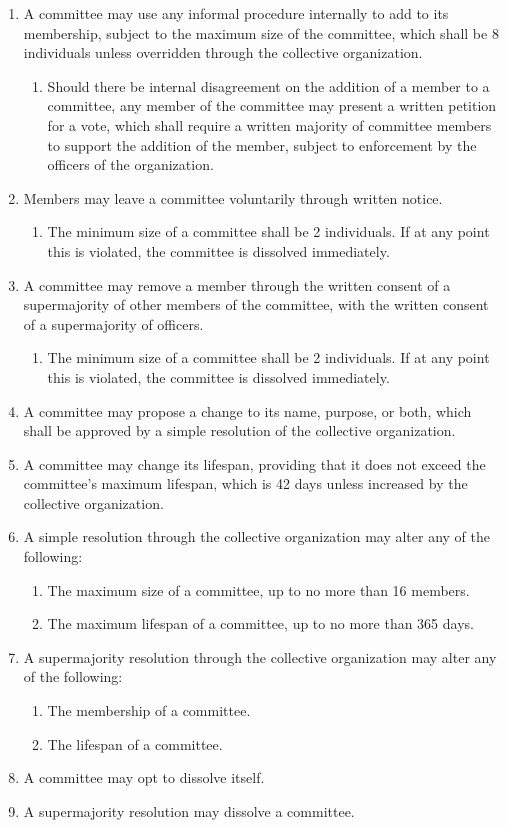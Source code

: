 \documentclass[11pt]{article}
\newcounter{h1}
\newcounter{h2}[h1]
\newcounter{h3}[h2]
\begin{document}
\begin{enumerate}
  \item A committee may use any informal procedure internally to add to its membership, subject to the maximum size of the committee, which shall be 8 individuals unless overridden through the collective organization.  
  \begin{enumerate}
    \item Should there be internal disagreement on the addition of a member to a committee, any member of the committee may present a written petition for a vote, which shall require a written majority of committee members to support the addition of the member, subject to enforcement by the officers of the organization.  
  \end{enumerate}
  \item Members may leave a committee voluntarily through written notice.  
  \begin{enumerate}
    \item The minimum size of a committee shall be 2 individuals. If at any point this is violated, the committee is dissolved immediately.  
  \end{enumerate}
  \item A committee may remove a member through the written consent of a supermajority of other members of the committee, with the written consent of a supermajority of officers.  
  \begin{enumerate}
    \item The minimum size of a committee shall be 2 individuals. If at any point this is violated, the committee is dissolved immediately.  
  \end{enumerate}
  \item A committee may propose a change to its name, purpose, or both, which shall be approved by a simple resolution of the collective organization.  
  \item A committee may change its lifespan, providing that it does not exceed the committee's maximum lifespan, which is 42 days unless increased by the collective organization.  
  \item A simple resolution through the collective organization may alter any of the following:  
  \begin{enumerate}
    \item The maximum size of a committee, up to no more than 16 members.  
    \item The maximum lifespan of a committee, up to no more than 365 days.  
  \end{enumerate}
  \item A supermajority resolution through the collective organization may alter any of the following:  
  \begin{enumerate}
    \item The membership of a committee.  
    \item The lifespan of a committee.  
  \end{enumerate}
  \item A committee may opt to dissolve itself.  
  \item A supermajority resolution may dissolve a committee.
\end{enumerate}
\end{document}
